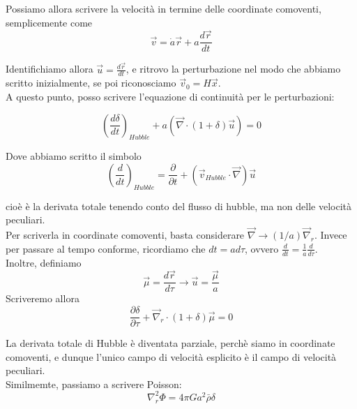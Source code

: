 \documentclass{report}
\begin{document}
Possiamo allora scrivere la velocità in termine delle coordinate comoventi, semplicemente come
\begin{equation}
    \vec{v} = \dot{a}\vec{r} + a\frac{d\vec{r}}{dt}
\end{equation}

Identifichiamo allora $\vec{u} = \frac{d\vec{r}}{dt}$, e ritrovo la perturbazione nel modo che abbiamo scritto inizialmente, se poi riconosciamo $\vec{v}_0 = H\vec{x}$. \\

A questo punto, posso scrivere l'equazione di continuità per le perturbazioni: 

\begin{equation}
    \left(\frac{d\delta}{dt}\right)_{Hubble} + a(\vec{\nabla}\cdot (1+\delta)\vec{u}) = 0     
\end{equation}

Dove abbiamo scritto il simbolo
\begin{equation}
    \left(\frac{d}{dt} \right)_{Hubble} = \frac{\partial }{\partial t} + (\vec{v}_{Hubble}\cdot \vec{\nabla})\vec{u}
\end{equation}

cioè è la derivata totale tenendo conto del flusso di hubble, ma non delle velocità peculiari. \\

Per scriverla in coordinate comoventi, basta considerare $\vec{\nabla} \rightarrow (1/a)\vec{\nabla}_r$. Invece per passare al tempo conforme, ricordiamo che $dt = ad\tau$, ovvero $\frac{d}{dt} = \frac{1}{a}\frac{d}{d\tau}$. \\

Inoltre, definiamo 
\begin{equation}
    \vec{\mu} = \frac{d\vec{r}}{d\tau} \rightarrow \vec{u} = \frac{\vec{\mu}}{a}
\end{equation}
Scriveremo allora 
\begin{equation}
    \frac{\partial\delta}{\partial \tau} + \vec{\nabla}_r\cdot(1+\delta)\vec{\mu} = 0 
\end{equation}

La derivata totale di Hubble è diventata parziale, perchè siamo in coordinate comoventi, e dunque l'unico campo di velocità esplicito è il campo di velocità peculiari. \\

Similmemte, passiamo a scrivere Poisson: 
\begin{equation}
    \nabla^2_r \Phi = 4\pi G a^2 \bar{\rho}\delta
\end{equation}
\end{document}
